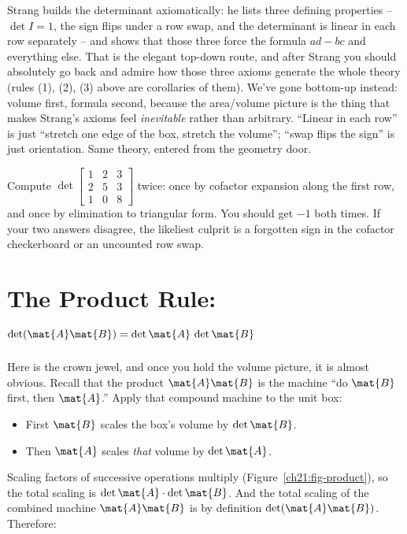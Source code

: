 \begin{strangbox}
Strang builds the determinant axiomatically: he lists three defining properties --
$\det I = 1$, the sign flips under a row swap, and the determinant is linear in
each row separately -- and shows that those three force the formula $ad-bc$ and
everything else. That is the elegant top-down route, and after Strang you should
absolutely go back and admire how those three axioms generate the whole theory
(rules (1), (2), (3) above are corollaries of them). We've gone bottom-up instead:
volume first, formula second, because the area/volume picture is the thing that
makes Strang's axioms feel \emph{inevitable} rather than arbitrary. ``Linear in
each row'' is just ``stretch one edge of the box, stretch the volume''; ``swap
flips the sign'' is just orientation. Same theory, entered from the geometry door.
\end{strangbox}

\begin{labbox}
Compute $\det\begin{bmatrix} 1 & 2 & 3 \\ 2 & 5 & 3 \\ 1 & 0 & 8 \end{bmatrix}$
twice: once by cofactor expansion along the first row, and once by elimination to
triangular form. You should get $-1$ both times. If your two answers disagree, the
likeliest culprit is a forgotten sign in the cofactor checkerboard or an
uncounted row swap.
\end{labbox}

\section{The Product Rule: \texorpdfstring{$\det(\mat{A}\mat{B}) = \det\mat{A}\,\det\mat{B}$}{det(AB)=detA detB}}
\label{ch21:product}

Here is the crown jewel, and once you hold the volume picture, it is almost
obvious. Recall that the product $\mat{A}\mat{B}$ is the machine ``do $\mat{B}$
first, then $\mat{A}$.'' Apply that compound machine to the unit box:

\begin{itemize}
  \item First $\mat{B}$ scales the box's volume by $\det\mat{B}$.
  \item Then $\mat{A}$ scales \emph{that} volume by $\det\mat{A}$.
\end{itemize}

Scaling factors of successive operations multiply (Figure~\ref{ch21:fig-product}),
so the total scaling is $\det\mat{A}\cdot\det\mat{B}$. And the total scaling of the
combined machine $\mat{A}\mat{B}$ is by definition $\det(\mat{A}\mat{B})$.
Therefore:

